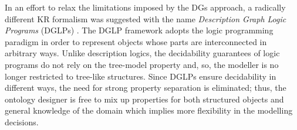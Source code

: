\documentclass[10pt]{bmc_article}
\newenvironment{bmcformat}{\baselineskip20pt\sloppy\setboolean{publ}{false}}{\baselineskip20pt\sloppy}
\begin{document}
\begin{bmcformat}
\begin{comment}
\draw [->,densely dashed] (cb) -- (c1);
 \draw [->,densely dashed] (cb) -- (c2);
 \draw [->,densely dashed] (cb) to [bend left=60]  (c3);
\draw [->,densely dashed] (cb) to [bend right=30] (c4);
\draw [->,densely dashed] (cb) to [bend right=60] (c5);
\draw [->,densely dashed] (cb) to (c6);
\node (caption) at (-1,-2.75) [] {(b) Canonical model with the DGs definition};
\end{tikzpicture}
&
\begin{tikzpicture}[thick]
\node (e1) at (-2.5,2.25) [] {};
\node (e2) at (-0.5,2.25) [] {};
\draw [->,densely dashed] (e1) -- (e2) node[midway,above]{$\mathsf{hasAtom}$};
\node (e1) at (-2.5,1.65) [] {};
\node (e2) at (-0.5,1.65) [] {};
\draw [-] (e1) -- (e2) node[midway,above]{$\mathsf{hasSingleBondWith}$};
\node (e1) at (-2.5,1.15) [] {};
\node (e2) at (-0.5,1.15) [] {};
\draw [-,double] (e1) -- (e2) node[midway,above]{$\mathsf{hasDoubleBondWith}$};

\node (c1) at (0.84,1.48) [] {\textbf{C}};
\node (c2) at (1.68,1) [] {\textbf{C}};
\node (c3) at (1.68,0) [] {\textbf{C}};
\node (c4) at (0.84,-0.48) [] {\textbf{C}};
\node (c5) at (0,0) [] {\textbf{C}};
\node (c6) at (0,1) [] {\textbf{C}};

\draw [-,double] (c1) -- (c2);
\draw [-] (c2) -- (c3);
\draw [-,double] (c3) -- (c4);
\draw [-] (c4) -- (c5);
\draw [-,double] (c5) -- (c6);
\draw [-] (c6) -- (c1);


\node (caption) at (0,-1.75) [] {(c) Chemical graph of benzene ring};
\end{tikzpicture} 
\end{tabular}
\end{tabular}
\caption{The chemical structure and the models of benzene ring}\label{fig:benzene}
\end{figure}

\end{comment}



In an effort to relax the limitations imposed by the DGs approach, a radically different KR formalism was suggested with the name \emph{Description Graph Logic Programs} (DGLPs) \cite{magka2011}. The DGLP framework adopts the logic programming paradigm in order to represent objects whose parts are interconnected in arbitrary ways. Unlike description logics, the decidability guarantees of logic programs do not rely on the tree-model property and, so, the modeller is no longer restricted to tree-like structures. Since DGLPs ensure decidability in different ways, the need for strong property separation is eliminated; thus, the ontology designer is free to mix up properties for both structured objects and general knowledge of the domain which implies more flexibility in the  modelling decisions.  



\end{bmcformat}
\end{document}
